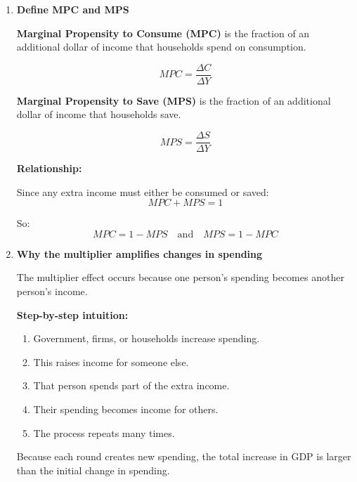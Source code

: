 \documentclass[12pt]{article}
\begin{document}
\begin{enumerate}[label=\textbf{\arabic*.}, start=7]

\item \textbf{Define MPC and MPS}

\textbf{Marginal Propensity to Consume (MPC)} is the fraction of an additional dollar of income that households spend on consumption.

\[
MPC = \frac{\Delta C}{\Delta Y}
\]

\textbf{Marginal Propensity to Save (MPS)} is the fraction of an additional dollar of income that households save.

\[
MPS = \frac{\Delta S}{\Delta Y}
\]

\textbf{Relationship:}

Since any extra income must either be consumed or saved:
\[
MPC + MPS = 1
\]

So:
\[
\boxed{MPC = 1 - MPS \quad \text{and} \quad MPS = 1 - MPC}
\]

\vspace{0.5em}

\item \textbf{Why the multiplier amplifies changes in spending}

The multiplier effect occurs because one person's spending becomes another person's income.

\textbf{Step-by-step intuition:}
\begin{enumerate}
    \item Government, firms, or households increase spending.
    \item This raises income for someone else.
    \item That person spends part of the extra income.
    \item Their spending becomes income for others.
    \item The process repeats many times.
\end{enumerate}

Because each round creates new spending, the total increase in GDP is larger than the initial change in spending.

\end{enumerate}
\end{document}
